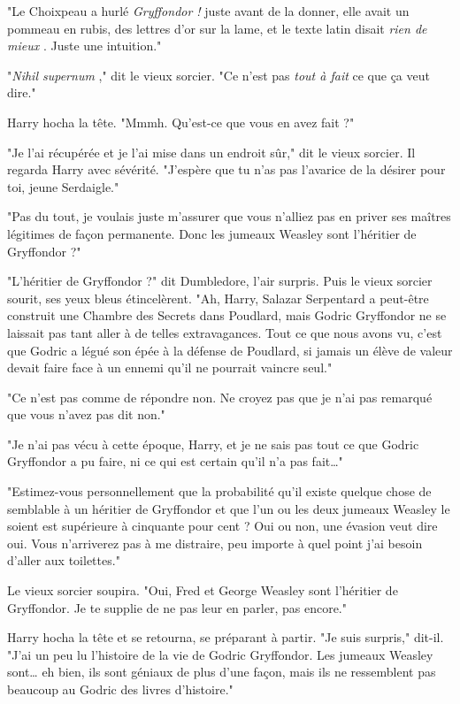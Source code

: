 "Le Choixpeau a hurlé \emph{Gryffondor !}  juste avant de la donner, elle avait un pommeau en rubis, des lettres d'or sur la lame, et le texte latin disait \emph{rien de mieux} . Juste une intuition."

"\emph{Nihil supernum} ," dit le vieux sorcier. "Ce n'est pas \emph{tout à fait}  ce que ça veut dire."

Harry hocha la tête. "Mmmh. Qu'est-ce que vous en avez fait ?"

"Je l'ai récupérée et je l'ai mise dans un endroit sûr," dit le vieux sorcier. Il regarda Harry avec sévérité. "J'espère que tu n'as pas l'avarice de la désirer pour toi, jeune Serdaigle."

"Pas du tout, je voulais juste m'assurer que vous n'alliez pas en priver ses maîtres légitimes de façon permanente. Donc les jumeaux Weasley sont l'héritier de Gryffondor ?"

"L'héritier de Gryffondor ?" dit Dumbledore, l'air surpris. Puis le vieux sorcier sourit, ses yeux bleus étincelèrent. "Ah, Harry, Salazar Serpentard a peut-être construit une Chambre des Secrets dans Poudlard, mais Godric Gryffondor ne se laissait pas tant aller à de telles extravagances. Tout ce que nous avons vu, c'est que Godric a légué son épée à la défense de Poudlard, si jamais un élève de valeur devait faire face à un ennemi qu'il ne pourrait vaincre seul."

"Ce n'est pas comme de répondre non. Ne croyez pas que je n'ai pas remarqué que vous n'avez pas dit non."

"Je n'ai pas vécu à cette époque, Harry, et je ne sais pas tout ce que Godric Gryffondor a pu faire, ni ce qui est certain qu'il n'a pas fait…"

"Estimez-vous personnellement que la probabilité qu'il existe quelque chose de semblable à un héritier de Gryffondor et que l'un ou les deux jumeaux Weasley le soient est supérieure à cinquante pour cent ? Oui ou non, une évasion veut dire oui. Vous n'arriverez pas à me distraire, peu importe à quel point j'ai besoin d'aller aux toilettes."

Le vieux sorcier soupira. "Oui, Fred et George Weasley sont l'héritier de Gryffondor. Je te supplie de ne pas leur en parler, pas encore."

Harry hocha la tête et se retourna, se préparant à partir. "Je suis surpris," dit-il. "J'ai un peu lu l'histoire de la vie de Godric Gryffondor. Les jumeaux Weasley sont… eh bien, ils sont géniaux de plus d'une façon, mais ils ne ressemblent pas beaucoup au Godric des livres d'histoire."

